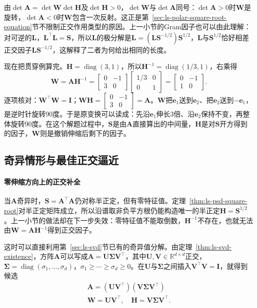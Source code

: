由$\det\bm A=\det\bm W\det\bm H$及$\det\bm H>0$，$\det\bm W$与$\det\bm A$同号：$\det\bm A>0$时$\bm W$是旋转，$\det\bm A<0$时$\bm W$包含一次反射。这正是第~\ref{sec:ls-polar-square-root-equation}节不限制正交作用类型的原因。上一小节的Gram因子也可以由此理解：对可逆的$\bm L$，$\bm L^\top\bm L=\bm S$，所以$\bm L$的极分解是$\bm L=(\bm L\bm S^{-1/2})\bm S^{1/2}$，$\bm L$与$\bm S^{1/2}$恰好相差正交因子$\bm L\bm S^{-1/2}$，这解释了二者为何给出相同的长度。

现在把贯穿例算完。$\bm H=\operatorname{diag}(3,1)$，所以$\bm H^{-1}=\operatorname{diag}(1/3,1)$，右乘得
\[
 \bm W=\bm A\bm H^{-1}
 =\begin{bmatrix}0&-1\\3&0\end{bmatrix}
 \begin{bmatrix}1/3&0\\0&1\end{bmatrix}
 =\begin{bmatrix}0&-1\\1&0\end{bmatrix}.
\]
逐项核对：$\bm W^\top\bm W=\bm I$；$\bm W\bm H=\left[\begin{smallmatrix}0&-1\\3&0\end{smallmatrix}\right]=\bm A$。$\bm W$把$\bm e_1$送到$\bm e_2$、把$\bm e_2$送到$-\bm e_1$，是逆时针旋转$90$度。于是原变换可以读成：先沿$\bm e_1$伸长$3$倍、沿$\bm e_2$保持不变，再整体旋转$90$度。在这个解题过程中，$\bm S$是由$\bm A$直接算出的中间量，$\bm H$是对$\bm S$开方得到的因子，$\bm W$则是撤销伸缩后剩下的因子。

\subsection{奇异情形与最佳正交逼近}
\label{sec:ls-polar-singular-best-orthogonal}

\paragraph{零伸缩方向上的正交补全}

当$\bm A$奇异时，$\bm S=\bm A^\top\bm A$仍对称半正定，但有零特征值。定理~\ref{thm:ls-psd-square-root}对半正定矩阵成立，所以沿谱取非负平方根仍能构造唯一的半正定$\bm H=\bm S^{1/2}$。上一小节的做法却在下一步失效：零特征值不能取倒数，$\bm H^{-1}$不存在，也就无法由$\bm W=\bm A\bm H^{-1}$得到正交因子。

这时可以直接利用第~\ref{sec:ls-svd}节已有的奇异值分解。由定理~\ref{thm:ls-svd-existence}，方阵$\bm A$可以写成$\bm A=\bm U\bm\Sigma\bm V^\top$，其中$\bm U,\bm V\in\mathbb R^{d\times d}$正交，$\bm\Sigma=\operatorname{diag}(\sigma_1,\ldots,\sigma_d)$，$\sigma_1\geq\cdots\geq\sigma_d\geq0$。在$\bm U$与$\bm\Sigma$之间插入$\bm V^\top\bm V=\bm I$，就得到候选
\begin{equation}
\begin{gathered}
 \bm A=(\bm U\bm V^\top)(\bm V\bm\Sigma\bm V^\top)\\
 \bm W=\bm U\bm V^\top,\quad \bm H=\bm V\bm\Sigma\bm V^\top .
\end{gathered}
\label{eq:ls-polar-from-svd}
\end{equation}

